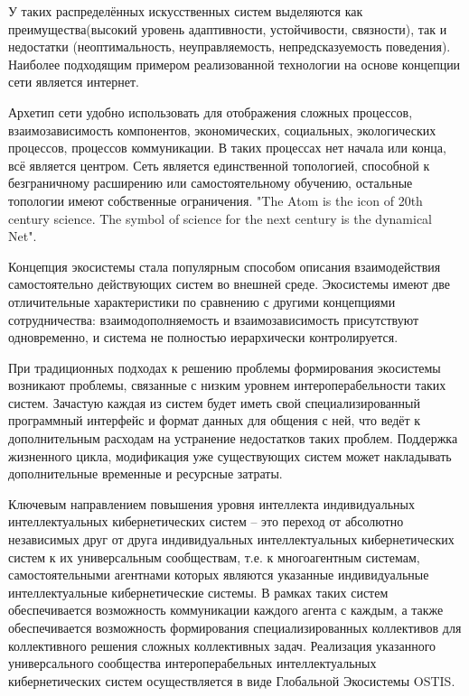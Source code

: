 У таких распределённых искусственных систем выделяются как преимущества(высокий уровень адаптивности, устойчивости, связности), так и недостатки (неоптимальность, неуправляемость, непредсказуемость поведения). Наиболее подходящим примером реализованной технологии на основе концепции сети является интернет.

Архетип сети удобно использовать для отображения сложных процессов, взаимозависимость компонентов, экономических, социальных, экологических процессов, процессов коммуникации. В таких процессах нет начала или конца, всё является центром. Сеть является единственной топологией, способной к безграничному расширению или самостоятельному обучению, остальные топологии имеют собственные ограничения. "The Atom is the icon of 20th century science. The symbol of science for the next century is the dynamical Net"{}.

Концепция экосистемы стала популярным способом описания взаимодействия самостоятельно действующих систем во внешней среде. 
Экосистемы имеют две отличительные характеристики по сравнению с другими концепциями сотрудничества: взаимодополняемость и взаимозависимость присутствуют одновременно, и система не полностью иерархически контролируется.

При традиционных подходах к решению проблемы формирования экосистемы возникают проблемы, связанные с низким уровнем интероперабельности таких систем.
Зачастую каждая из систем будет иметь свой специализированный программный интерфейс и формат данных для общения с ней, что ведёт к дополнительным расходам на устранение недостатков таких проблем. Поддержка жизненного цикла, модификация уже существующих систем может накладывать дополнительные временные и ресурсные затраты. 

Ключевым направлением повышения уровня интеллекта индивидуальных интеллектуальных кибернетических систем -- это переход от абсолютно независимых друг от друга индивидуальных интеллектуальных кибернетических систем к их универсальным сообществам, т.е. к многоагентным системам, самостоятельными агентнами которых являются указанные индивидуальные интеллектуальные кибернетические системы.
В рамках таких систем обеспечивается возможность коммуникации каждого агента с каждым, а также обеспечивается возможность формирования специализированных коллективов для коллективного решения сложных коллективных задач.
Реализация указанного универсального сообщества интероперабельных интеллектуальных кибернетических систем осуществляется в виде Глобальной Экосистемы OSTIS.








%
